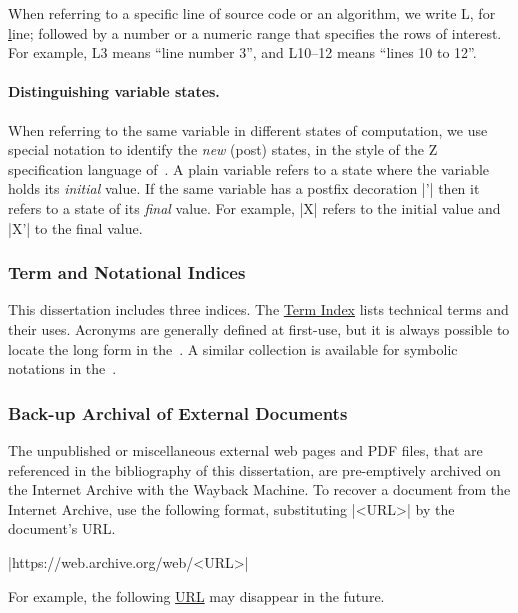 When referring to a specific line of source code or an algorithm, we write L, for \underline{l}ine;
followed by a number or a numeric range that specifies the rows of interest.
For example, L3 means \enquote{line number 3}, and L10--12 means \enquote{lines 10 to 12}.

\paragraph*{Distinguishing variable states.}
When referring to the same variable in different states of computation, we use special notation to identify the \emph{new} (post) states,
in the style of the Z specification language of~\textcite{spivey1992}.
A plain variable refers to a state where the variable holds its \emph{initial} value.
If the same variable has a postfix decoration \pr|'| then it refers to a state of its \emph{final} value.
For example, \pr|X| refers to the initial value and \pr|X'| to the final value.

\subsubsection{Term and Notational Indices}

This dissertation includes three indices.
The \hyperref[sec:app:index]{Term Index} lists technical terms and their uses.
Acronyms are generally defined at first-use, but it is always possible to locate the long form in the~\nameref{\acronymtype}.
A similar collection is available for symbolic notations in the~.

\subsubsection{Back-up Archival of External Documents}

The unpublished or miscellaneous external web pages and PDF files, that are referenced in the bibliography of this dissertation,
are pre-emptively archived on the Internet Archive with the Wayback Machine.
To recover a document from the Internet Archive, use the following format, substituting \pr|<URL>| by the document's URL\@.

\begin{center}
\pr|https://web.archive.org/web/<URL>|
\end{center}

For example, the following \href{https://types22.inria.fr/files/2022/06/TYPES_2022_paper_14.pdf}{URL} may disappear in the future.

